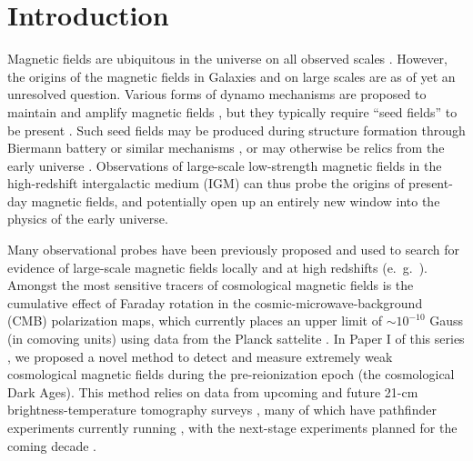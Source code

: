 \section{Introduction}
\label{sec:intro}

Magnetic fields are ubiquitous in the universe on all observed scales \cite{2013A&ARv..21...62D,Vallee04,Neronov10,2005LNP...664...89W,2012SSRv..166..215B}. However, the origins of the magnetic fields in Galaxies and on large scales are as of yet an unresolved question. Various forms of dynamo mechanisms are proposed to maintain and amplify magnetic fields \cite{2013PhRvE..87e3110P}, but they typically require ``seed fields'' to be present \cite{2013A&ARv..21...62D}. Such seed fields may be produced during structure formation through Biermann battery or similar mechanisms \cite{Naoz13,2013PhRvL.111e1303N}, or may otherwise be relics from the early universe \cite{2013A&ARv..21...62D,2012SSRv..166...37W,2014JCAP...05..040K}. Observations of large-scale low-strength magnetic fields in the high-redshift intergalactic medium (IGM) can thus probe the origins of present-day magnetic fields, and potentially open up an entirely new window into the physics of the early universe.

Many observational probes have been previously proposed and used to search for evidence of large-scale magnetic fields locally and at high redshifts (e.~g.~\cite{Yamazaki10,Blasi99,Tavecchio10,Dolag11,2005LNP...664...89W,2014JCAP...01..009K,2013ApJ...770...47K,2014PhRvD..89j3522S,2006MNRAS.372.1060T,2009ApJ...692..236S}). Amongst the most sensitive tracers of cosmological magnetic fields is the cumulative effect of Faraday rotation in the cosmic-microwave-background (CMB) polarization maps, which currently places an upper limit of $\sim$$10^{-10}$ Gauss (in comoving units) using data from the Planck sattelite \cite{2015arXiv150201594P}. In Paper I of this series \cite{2014arXiv1410.2250V}, we proposed a novel method to detect and measure extremely weak cosmological magnetic fields during the pre-reionization epoch (the cosmological Dark Ages). This method relies on data from upcoming and future 21-cm brightness-temperature tomography surveys \cite{1997ApJ...475..429M,2004PhRvL..92u1301L}, many of which have pathfinder experiments currently running \cite{2012arXiv1201.1700G,2011AAS...21813206B,2014ApJ...788..106P,2008arXiv0802.1727C,Vanderlinde14,2015AAS...22532803D}, with the next-stage experiments planned for the coming decade \cite{2008arXiv0802.1727C,2015AAS...22532803D}. 

